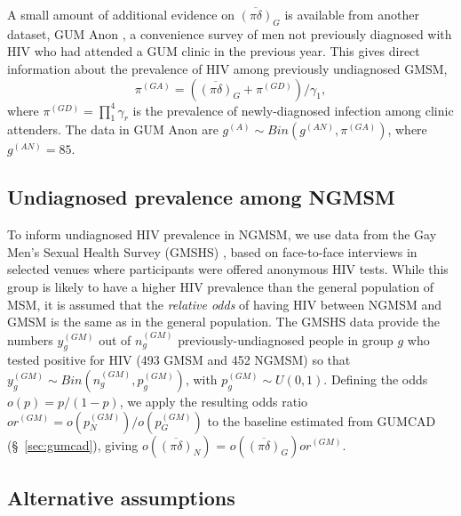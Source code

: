 \documentclass[12pt]{article}\usepackage[]{graphicx}\usepackage[]{color}
\newcommand{\pinodelta}{\overline{(\pi\delta)}}
\begin{document}
A small amount of additional evidence on $\pinodelta_G$ is available from another dataset, GUM Anon \citep{gumanon}, a convenience survey of men not previously diagnosed with HIV who had attended a GUM clinic in the previous year.   This gives direct information about the prevalence of HIV among previously undiagnosed GMSM, 
\begin{equation}
  \label{eq:gumanon}
  \pi^{(GA)} = (\pinodelta_G + \pi^{(GD)}) / \gamma_1,  
\end{equation}
where $\pi^{(GD)} = \prod_1^{4}\gamma_r$ is the prevalence of newly-diagnosed infection among clinic attenders.  The data in GUM Anon are $g^{(A)} \sim Bin(g^{(AN)}, \pi^{(GA)})$, where \iftoggle{nodata}{}{$g^{(A)}=4$ and }$g^{(AN)}=85$. 

\subsection{Undiagnosed prevalence among NGMSM}
\label{sec:gmshs}

To inform undiagnosed HIV prevalence in NGMSM, we use data from the Gay Men's Sexual Health Survey (GMSHS) \citep{GMSHS}, based on face-to-face interviews in selected venues where participants were offered anonymous HIV tests.  While this group is likely to have a higher HIV prevalence than the general population of MSM, it is assumed that the \emph{relative odds} of having HIV between NGMSM and GMSM is the same as in the general population.  The GMSHS data provide the numbers $y^{(GM)}_g$ out of $n^{(GM)}_g$ previously-undiagnosed people in group $g$ who tested positive for HIV (\iftoggle{nodata}{}{20 out of }493 GMSM and \iftoggle{nodata}{}{20 out of }452 NGMSM) so that $y^{(GM)}_g \sim Bin(n^{(GM)}_g,p^{(GM)}_g)$, with $p^{(GM)}_g \sim U(0,1)$.  Defining the odds $o(p) = p/(1-p)$, we apply the resulting odds ratio $or^{(GM)} = o(p^{(GM)}_N) / o(p^{(GM)}_G)$ to the baseline estimated from GUMCAD (\S~\ref{sec:gumcad}), giving $o(\pinodelta_N)$ = $o(\pinodelta_G) or^{(GM)}$.


\subsection{Alternative assumptions} 
\label{sec:alternative} 
\end{document}
